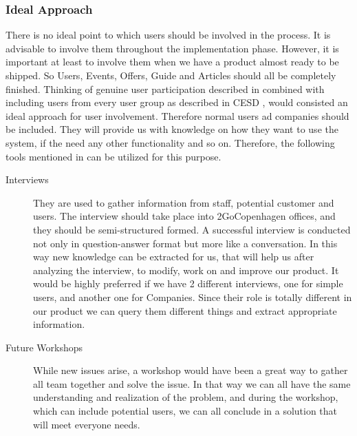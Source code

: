 \subsubsection{Ideal Approach}
 There is no ideal point to which users should be involved in the process. It is advisable to involve them throughout the implementation phase. However, it is important at least to involve them  when we have a product almost ready to be shipped. So Users, Events, Offers, Guide and Articles should all be completely finished.
 Thinking of genuine user participation described in \cite{BodkerUserInvolvement} combined with including users from every user group as described in CESD \cite{CESD}, would consisted an ideal approach for user involvement. Therefore normal users ad companies should be included. They will provide us with knowledge on how they want to use the system, if the need any other functionality and so on.
Therefore, the following tools mentioned in \cite{BodkerUserInvolvement} can be utilized for this purpose.
\begin{description}
		\item[Interviews] They are used to gather information from staff, potential customer and users. The interview should take place into 2GoCopenhagen offices, and they should be semi-structured formed. A successful interview is conducted not only in question-answer format but more like a conversation. In this way new knowledge can be extracted for us, that will help us after analyzing the interview, to modify, work on and improve our product. It would be highly preferred if we have 2 different interviews, one for simple users, and another one for Companies. Since their role is totally different in our product we can query them different things and extract appropriate information.
		\item[Future Workshops] While new issues arise, a workshop would have been a great way to gather all team together and solve the issue. In that way we can all have the same understanding and realization of the problem, and during the workshop, which can include potential users, we can all conclude in a solution that will meet everyone needs.
\end{description}
